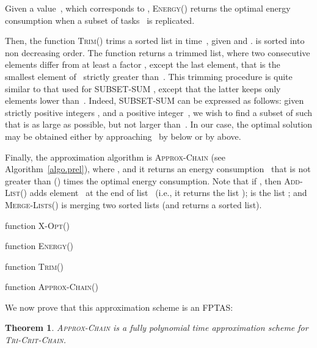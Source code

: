 \documentclass[a4paper]{article}
\theoremstyle{plain}
\newtheorem{theorem}{Theorem}
\theoremstyle{definition}
\theoremstyle{remark}
\newcommand{\energy}{\textsc{Energy}} \newcommand{\exe}{\ensuremath{\mathcal{E}\!xe}\xspace}
\newcommand{\approxchain}{\textsc{Ap\-prox-Chain}}
\newcommand{\xopt}{\textsc{X-Opt}}
\newcommand{\merge}{\textsc{Merge-Lists}}
\newcommand{\add}{\textsc{Add-List}}
\newcommand{\trim}{\textsc{Trim}}
\newcommand{\chain}{\textsc{Tri-Crit-Chain}\xspace}
\begin{document}
Given a value~, which corresponds to , 
\energy() returns the optimal energy consumption when a
subset of tasks~ is replicated. 

Then, the function \trim() trims a sorted list
 in time~, given  and
.  is sorted into non decreasing order. The function
returns a trimmed list, where two consecutive elements differ from at
least a factor , except the last element, that is the
smallest element of~ strictly greater than~. This trimming
procedure is quite similar to that used for SUBSET-SUM \cite{cormen},
except that the latter keeps only elements lower than~. Indeed,
SUBSET-SUM can be expressed as follows: given  strictly positive
integers , and a positive integer~, we wish to
find a subset  of  such that \mbox{}
is as large as possible, but not larger than~.  
 In our case, the optimal solution may be
obtained either by approaching~ by below or by above.   


Finally, the approximation algorithm is \approxchain
(see Algorithm~\ref{algo.prel}),
where \mbox{}, and it returns an energy consumption~ that is
not greater than \mbox{()} times the optimal energy
consumption. 
Note that if , then \add() adds
element~ at the end of list~ (i.e., it returns the list
);  is the list
; and \merge() is merging two sorted
lists (and returns a sorted list).


 
\begin{algorithm}
\caption{Approximation algorithm for \chain.}
\label{algo.prel}
function {\xopt}()\\
\Begin{
\;
\lIf{}{\Return{}\;}
\lElse{\Return{}\;}
}

function {\energy}()\\
\Begin{
\;
\lIf{}{\Return{}\!\!\;}
\lElse{\Return{}\;}
}

function {\trim}()\\




function \approxchain()\\
\end{algorithm}


We now prove that this approximation scheme is an FPTAS: 

\begin{theorem}
    \label{approx.chain}
    \approxchain\xspace is a fully polynomial time approximation
    scheme for \chain.
\end{theorem}
\end{document}
